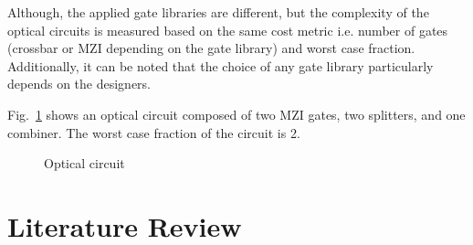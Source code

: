 \documentclass[10pt,letterpaper,twoside,openright]{book}
\begin{document}

Although, the applied gate libraries are different, but the complexity of the optical circuits is measured based on the same cost metric i.e. number of gates (crossbar or MZI depending on the gate library) and worst case fraction. Additionally, it can be noted that the choice of any gate library particularly depends on the designers. 
 

\begin{example}
Fig.~\ref{fig:circuit} shows an optical circuit composed of two MZI gates, two splitters, and one combiner. The worst case fraction of the circuit is 2.
\end{example}

\begin{figure}[!h]
\centering
{}
\vspace{-.1cm}
\caption{Optical circuit}\vspace{-.5cm}
\label{fig:circuit}
\end{figure}

\section{Literature Review}
\end{document}
